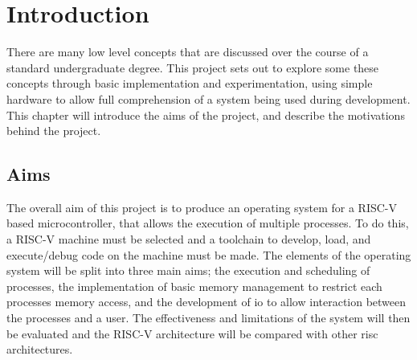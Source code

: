\chapter{Introduction}
\label{cha:intro}
There are many low level concepts that are discussed over the course of a standard undergraduate degree. This project sets out to explore some these concepts through basic implementation and experimentation, using simple hardware to allow full comprehension of a system being used during development. This chapter will introduce the aims of the project, and describe the motivations behind the project.
\section{Aims}
The overall aim of this project is to produce an operating system for a RISC-V based microcontroller, that allows the execution of multiple processes. To do this, a RISC-V machine must be selected and a toolchain to develop, load, and execute/debug code on the machine must be made. The elements of the operating system will be split into three main aims; the execution and scheduling of processes, the implementation of basic memory management to restrict each processes memory access, and the development of \ac{io} to allow interaction between the processes and a user. The effectiveness and limitations of the system will then be evaluated and the RISC-V architecture will be compared with other \ac{risc} architectures.

